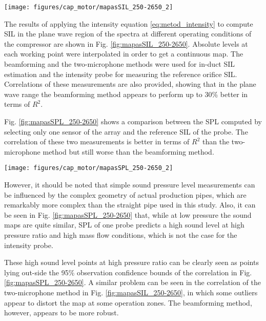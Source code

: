 \begin{figure*}[b!]
\hspace{-0.06\textwidth}
\texttt{[image: figures/cap\_motor/mapasSIL\_250-2650\_2]}
\caption{In duct SIL maps of the compressor noise estimated by the beamforming method (top left), two microphone method (top right) and SIL map of orifice noise as measured by the probe (top center), including correlations between the three measurements (bottom).}
\label{fig:mapasSIL_250-2650}
\end{figure*}

The results of applying the intensity equation \ref{eq:metod_intensity} to compute SIL in the plane wave region of the spectra at different operating conditions of the compressor are shown in Fig. \ref{fig:mapasSIL_250-2650}. Absolute levels at each working point were interpolated in order to get a continuous map. The beamforming and the two-microphone methods were used for in-duct SIL estimation and the intensity probe for measuring the reference orifice SIL. Correlations of these measurements are also provided, showing that in the plane wave range the beamforming method appears to perform up to 30\% better in terms of $R^2$.

Fig. \ref{fig:mapasSPL_250-2650} shows a comparison between the SPL computed by selecting only one sensor of the array and the reference SIL of the probe. The correlation of these two measurements is better in terms of $R^2$ than the two-microphone method but still worse than the beamforming method.

\begin{figure*}[tb!]
\centering
\texttt{[image: figures/cap\_motor/mapasSPL\_250-2650\_2]}
\caption{Comparison of compressor sound maps (plane wave region) obtained through interpolation of SPL at the inlet 1st sensor and SIL at the probe, including a correlation between both.}
\label{fig:mapasSPL_250-2650}
\end{figure*}

However, it should be noted that simple sound pressure level measurements can be influenced by the complex geometry of actual production pipes, which are remarkably more complex than the straight pipe used in this study. Also, it can be seen in Fig. \ref{fig:mapasSPL_250-2650} that, while at low pressure the sound maps are quite similar, SPL of one probe predicts a high sound level at high pressure ratio and high mass flow conditions, which is not the case for the intensity probe.

These high sound level points at high pressure ratio can be clearly seen as points lying out-side the 95\% observation confidence bounds of the correlation in Fig. \ref{fig:mapasSPL_250-2650}. A similar problem can be seen in the correlation of the two-microphone method in Fig. \ref{fig:mapasSIL_250-2650}, in which some outliers appear to distort the map at some operation zones. The beamforming method, however, appears to be more robust.

